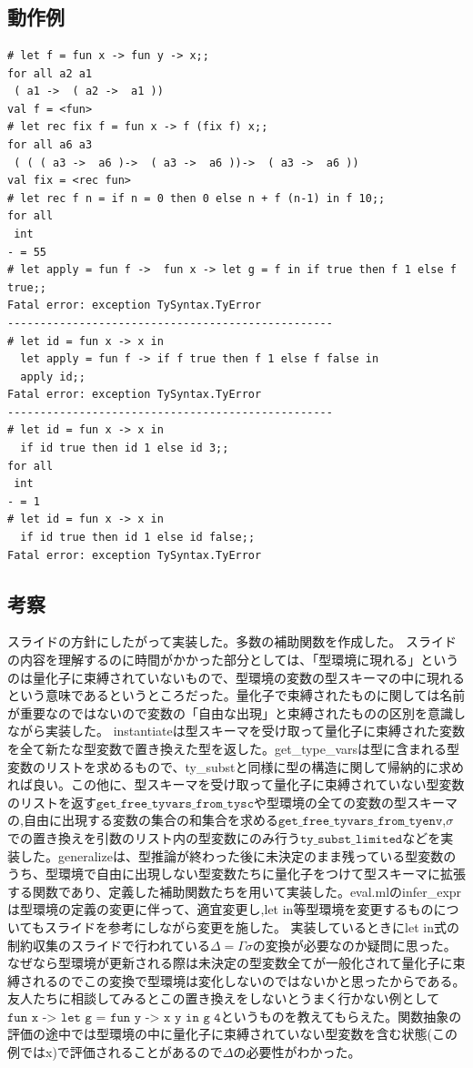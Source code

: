 \documentclass[11pt,a4paper]{jsarticle}
\begin{document}
\section*{}
\subsection*{動作例}
\begin{lstlisting}[basicstyle=\ttfamily\footnotesize, frame=single]
# let f = fun x -> fun y -> x;;
for all a2 a1 
 ( a1 ->  ( a2 ->  a1 ))
val f = <fun>
# let rec fix f = fun x -> f (fix f) x;;
for all a6 a3 
 ( ( ( a3 ->  a6 )->  ( a3 ->  a6 ))->  ( a3 ->  a6 ))
val fix = <rec fun>
# let rec f n = if n = 0 then 0 else n + f (n-1) in f 10;;
for all 
 int
- = 55
# let apply = fun f ->  fun x -> let g = f in if true then f 1 else f true;;
Fatal error: exception TySyntax.TyError
--------------------------------------------------
# let id = fun x -> x in
  let apply = fun f -> if f true then f 1 else f false in
  apply id;;
Fatal error: exception TySyntax.TyError
--------------------------------------------------
# let id = fun x -> x in
  if id true then id 1 else id 3;;
for all 
 int
- = 1
# let id = fun x -> x in
  if id true then id 1 else id false;;
Fatal error: exception TySyntax.TyError
\end{lstlisting}
\subsection*{考察}
スライドの方針にしたがって実装した。多数の補助関数を作成した。
スライドの内容を理解するのに時間がかかった部分としては、「型環境に現れる」というのは量化子に束縛されていないもので、型環境の変数の型スキーマの中に現れるという意味であるというところだった。量化子で束縛されたものに関しては名前が重要なのではないので変数の「自由な出現」と束縛されたものの区別を意識しながら実装した。
instantiateは型スキーマを受け取って量化子に束縛された変数を全て新たな型変数で置き換えた型を返した。get\_type\_varsは型に含まれる型変数のリストを求めるもので、ty\_substと同様に型の構造に関して帰納的に求めれば良い。この他に、型スキーマを受け取って量化子に束縛されていない型変数のリストを返す$\texttt{get\_free\_tyvars\_from\_tysc}$や型環境の全ての変数の型スキーマの,自由に出現する変数の集合の和集合を求める$\texttt{get\_free\_tyvars\_from\_tyenv}$,$\sigma$での置き換えを引数のリスト内の型変数にのみ行う$\texttt{ty\_subst\_limited}$などを実装した。generalizeは、型推論が終わった後に未決定のまま残っている型変数のうち、型環境で自由に出現しない型変数たちに量化子をつけて型スキーマに拡張する関数であり、定義した補助関数たちを用いて実装した。eval.mlのinfer\_exprは型環境の定義の変更に伴って、適宜変更し,let in等型環境を変更するものについてもスライドを参考にしながら変更を施した。
実装しているときにlet in式の制約収集のスライドで行われている$\Delta = \Gamma \sigma$の変換が必要なのか疑問に思った。なぜなら型環境が更新される際は未決定の型変数全てが一般化されて量化子に束縛されるのでこの変換で型環境は変化しないのではないかと思ったからである。友人たちに相談してみるとこの置き換えをしないとうまく行かない例として$\texttt{fun x -> let g = fun y -> x y in g 4}$というものを教えてもらえた。関数抽象の評価の途中では型環境の中に量化子に束縛されていない型変数を含む状態(この例ではx)で評価されることがあるので$\Delta$の必要性がわかった。
\end{document}
